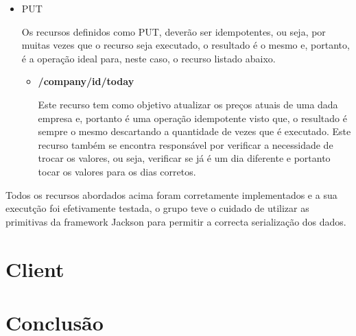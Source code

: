 \documentclass[a4paper,12pt]{article}
\begin{document}
\begin{itemize}
\begin{itemize}
    
  \end{itemize}
\item PUT
  \par Os recursos definidos como PUT, deverão ser idempotentes, ou seja, por muitas vezes que o recurso seja executado, o resultado é o mesmo e, portanto, é a operação ideal para, neste caso, o recurso listado abaixo.
  \begin{itemize}
    \item \textbf{/company/{id}/today}

    \par Este recurso tem como objetivo atualizar os preços atuais de uma dada empresa e, portanto é uma operação idempotente visto que, o resultado é sempre o mesmo descartando a quantidade de vezes que é executado. Este recurso também se encontra responsável por verificar a necessidade de trocar os valores, ou seja, verificar se já é um dia diferente e portanto tocar os valores para os dias corretos.
  \end{itemize}
\end{itemize}

\par Todos os recursos abordados acima foram corretamente implementados e a sua executção foi efetivamente testada, o grupo teve o cuidado de utilizar as primitivas da framework Jackson para permitir a correcta serialização dos dados.

\section{Client}

\section{Conclusão}
\end{document}
